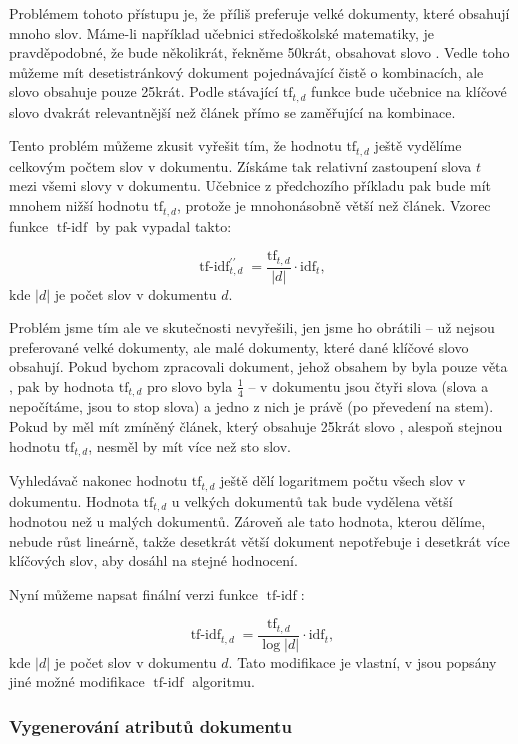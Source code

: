 \documentclass[12pt]{article}
\newcommand{\sssection}[1]{\subsubsection{#1}}
\DeclareMathOperator{\tfidf}{tf-idf}
\begin{document}
Problémem tohoto přístupu je, že příliš preferuje velké dokumenty, které obsahují mnoho slov. Máme-li například učebnici středoškolské matematiky, je pravděpodobné, že bude několikrát, řekněme 50krát, obsahovat slovo . Vedle toho můžeme mít desetistránkový dokument pojednávající čistě o kombinacích, ale slovo  obsahuje pouze 25krát. Podle stávající $\mbox{tf}_{t,d}$ funkce bude učebnice na klíčové slovo  dvakrát relevantnější než článek přímo se zaměřující na kombinace. 

Tento problém můžeme zkusit vyřešit tím, že hodnotu $\mbox{tf}_{t,d}$ ještě vydělíme celkovým počtem slov v dokumentu. Získáme tak relativní zastoupení slova $t$ mezi všemi slovy v dokumentu. Učebnice z předchozího příkladu pak bude mít mnohem nižší hodnotu $\mbox{tf}_{t,d}$, protože je mnohonásobně větší než článek. Vzorec funkce $\tfidf$ by pak vypadal takto:

$$
\tfidf_{t,d}^{\prime\prime} = \frac{\mbox{tf}_{t,d}}{|d|}\cdot\mbox{idf}_t,
$$
kde $|d|$ je počet slov v dokumentu $d$.

Problém jsme tím ale ve skutečnosti nevyřešili, jen jsme ho obrátili -- už nejsou preferované velké dokumenty, ale malé dokumenty, které dané klíčové slovo obsahují. Pokud bychom zpracovali dokument, jehož obsahem by byla pouze věta , pak by hodnota $\mbox{tf}_{t,d}$ pro slovo  byla $\frac14$ -- v dokumentu jsou čtyři slova (slova  a  nepočítáme, jsou to stop slova) a jedno z nich je právě  (po převedení na stem). Pokud by měl mít zmíněný článek, který obsahuje 25krát slovo , alespoň stejnou hodnotu $\mbox{tf}_{t,d}$, nesměl by mít více než sto slov. 

Vyhledávač nakonec hodnotu $\mbox{tf}_{t,d}$ ještě dělí logaritmem počtu všech slov v dokumentu. Hodnota $\mbox{tf}_{t,d}$ u velkých dokumentů tak bude vydělena větší hodnotou než u malých dokumentů. Zároveň ale tato hodnota, kterou dělíme, nebude růst lineárně, takže desetkrát větší dokument nepotřebuje i desetkrát více klíčových slov, aby dosáhl na stejné hodnocení.

Nyní můžeme napsat finální verzi funkce $\tfidf$:

$$
\tfidf_{t,d} = \frac{\mbox{tf}_{t,d}}{\log |d|}\cdot\mbox{idf}_t,
$$
kde $|d|$ je počet slov v dokumentu $d$. Tato modifikace je vlastní, v \cite{introir} jsou popsány jiné možné modifikace $\tfidf$ algoritmu. 

\sssection{Vygenerování atributů dokumentu}
\end{document}
